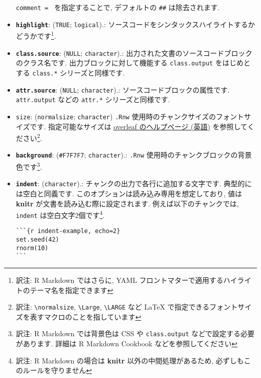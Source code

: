 \documentclass[
  xelatex,ja=standard,jafont=noto]{bxjsreport}
\begin{document}
\begin{itemize}
  \texttt{comment\ =\ \textquotesingle{}\textquotesingle{}}
  を指定することで, デフォルトの \texttt{\#\#} は除去されます.
\item
  \textbf{\texttt{highlight}}: (\texttt{TRUE}; \texttt{logical}).:
  ソースコードをシンタックスハイライトするかどうかです\footnote{訳注: R
    Markdown ではさらに, YAML
    フロントマターで適用するハイライトのテーマ名を指定できます}.
\item
  \textbf{\texttt{class.source}}: (\texttt{NULL}; \texttt{character}).:
  出力された文書のソースコードブロックのクラス名です.
  出力ブロックに対して機能する \texttt{class.output} をはじめとする
  \texttt{class.*} シリーズと同様です.
\item
  \textbf{\texttt{attr.source}}: (\texttt{NULL}; \texttt{character}).:
  ソースコードブロックの属性です. \texttt{attr.output} などの
  \texttt{attr.*} シリーズと同様です.
\item
  \texttt{size}:
  (\texttt{\textquotesingle{}normalsize\textquotesingle{}};
  \texttt{character}) \texttt{.Rnw}
  使用時のチャンクサイズのフォントサイズです. 指定可能なサイズは
  \href{https://www.overleaf.com/learn/latex/Font_sizes,_families,_and_styles}{overleaf
  のヘルプページ (英語)} を参照してください\footnote{訳注:
    \texttt{\textbackslash{}normalsize}, \texttt{\textbackslash{}Large},
    \texttt{\textbackslash{}LARGE} など LaTeX
    で指定できるフォントサイズを表すマクロのことを指しています}.
\item
  \textbf{\texttt{background}}:
  (\texttt{\textquotesingle{}\#F7F7F7\textquotesingle{}};
  \texttt{character}).: \texttt{.Rnw}
  使用時のチャンクブロックの背景色です\footnote{訳注: R Markdown
    では背景色は CSS や \texttt{class.output}
    などで設定する必要があります. 詳細は R Markdown Cookbook
    などを参照してください}.
\item
  \textbf{\texttt{indent}}: (\texttt{character}).:
  チャンクの出力で各行に追加する文字です. 典型的には空白と同義です.
  このオプションは読み込み専用を想定しており, 値は \textbf{knitr}
  が文書を読み込む際に設定されます. 例えば以下のチャンクでは,
  \texttt{indent} は空白文字2個です\footnote{訳注: R Markdown の場合は
    \textbf{knitr} 以外の中間処理があるため,
    必ずしもこのルールを守りません}.

\begin{verbatim}
```{r indent-example, echo=2}
set.seed(42)
rnorm(10)
```
\end{verbatim}

  \hypertarget{options-cache}{%
}
\end{itemize}
\end{document}
